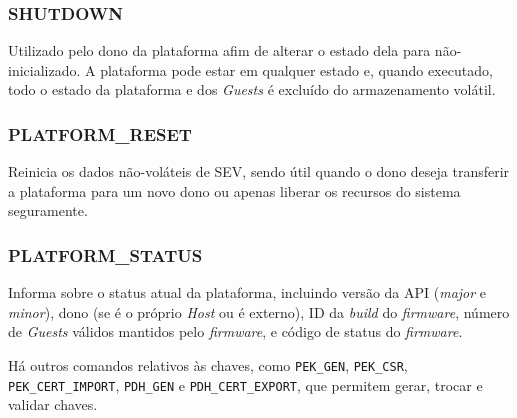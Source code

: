 \documentclass{report}
\begin{document}
\subsubsection{SHUTDOWN}

Utilizado pelo dono da plataforma afim de alterar o estado dela para
não-inicializado. A plataforma pode estar em qualquer estado e, quando
executado, todo o estado da plataforma e dos \textit{Guests} é excluído do
armazenamento volátil.

\subsubsection{PLATFORM\_RESET}

Reinicia os dados não-voláteis de SEV, sendo útil quando o dono deseja
transferir a plataforma para um novo dono ou apenas liberar os recursos do
sistema seguramente.

\subsubsection{PLATFORM\_STATUS}

Informa sobre o status atual da plataforma, incluindo versão da API
(\textit{major} e \textit{minor}), dono (se é o próprio \textit{Host} ou é
externo), ID da \textit{build} do \textit{firmware}, número de \textit{Guests}
válidos mantidos pelo \textit{firmware}, e código de status do
\textit{firmware}.


Há outros comandos relativos às chaves, como \texttt{PEK\_GEN},
\texttt{PEK\_CSR}, \texttt{PEK\_CERT\_IMPORT}, \texttt{PDH\_GEN} e
\texttt{PDH\_CERT\_EXPORT}, que permitem gerar, trocar e validar chaves.


\nocite{*}

\end{document}
